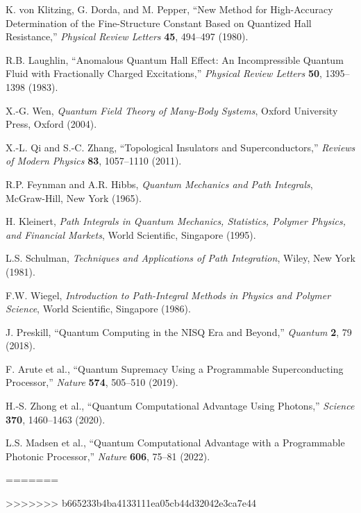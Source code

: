 \documentclass[11pt]{article}
\theoremstyle{plain}
\theoremstyle{definition}
\theoremstyle{remark}
\begin{document}
\begin{thebibliography}{99}
 K. von Klitzing, G. Dorda, and M. Pepper, ``New Method for High-Accuracy Determination of the Fine-Structure Constant Based on Quantized Hall Resistance,'' \emph{Physical Review Letters} \textbf{45}, 494--497 (1980).

 R.B. Laughlin, ``Anomalous Quantum Hall Effect: An Incompressible Quantum Fluid with Fractionally Charged Excitations,'' \emph{Physical Review Letters} \textbf{50}, 1395--1398 (1983).

 X.-G. Wen, \emph{Quantum Field Theory of Many-Body Systems}, Oxford University Press, Oxford (2004).

 X.-L. Qi and S.-C. Zhang, ``Topological Insulators and Superconductors,'' \emph{Reviews of Modern Physics} \textbf{83}, 1057--1110 (2011).

 R.P. Feynman and A.R. Hibbs, \emph{Quantum Mechanics and Path Integrals}, McGraw-Hill, New York (1965).

 H. Kleinert, \emph{Path Integrals in Quantum Mechanics, Statistics, Polymer Physics, and Financial Markets}, World Scientific, Singapore (1995).

 L.S. Schulman, \emph{Techniques and Applications of Path Integration}, Wiley, New York (1981).

 F.W. Wiegel, \emph{Introduction to Path-Integral Methods in Physics and Polymer Science}, World Scientific, Singapore (1986).

 J. Preskill, ``Quantum Computing in the NISQ Era and Beyond,'' \emph{Quantum} \textbf{2}, 79 (2018).

 F. Arute et al., ``Quantum Supremacy Using a Programmable Superconducting Processor,'' \emph{Nature} \textbf{574}, 505--510 (2019).

 H.-S. Zhong et al., ``Quantum Computational Advantage Using Photons,'' \emph{Science} \textbf{370}, 1460--1463 (2020).

 L.S. Madsen et al., ``Quantum Computational Advantage with a Programmable Photonic Processor,'' \emph{Nature} \textbf{606}, 75--81 (2022).

\end{thebibliography}
=======

>>>>>>> b665233b4ba4133111ea05cb44d32042e3ca7e44
\end{document}
